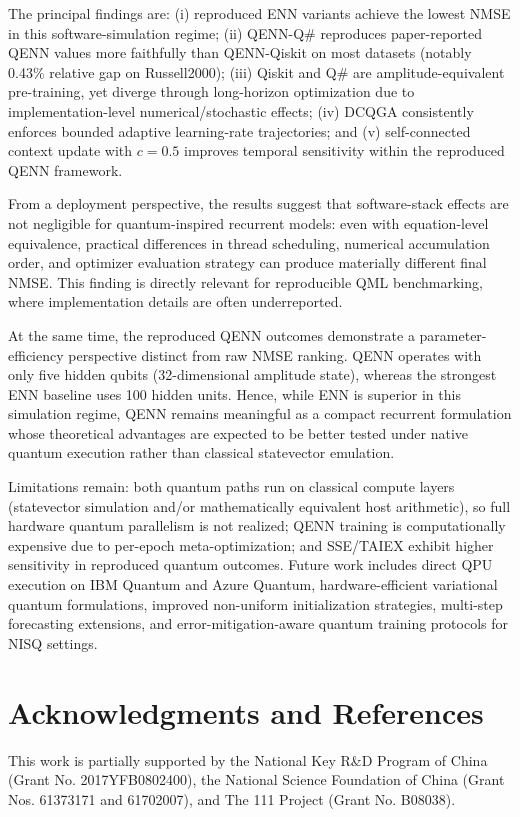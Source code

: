 \documentclass[conference]{IEEEtran}
\begin{document}
The principal findings are: (i) reproduced ENN variants achieve the lowest NMSE in this software-simulation regime; (ii) QENN-Q\# reproduces paper-reported QENN values more faithfully than QENN-Qiskit on most datasets (notably 0.43\% relative gap on Russell2000); (iii) Qiskit and Q\# are amplitude-equivalent pre-training, yet diverge through long-horizon optimization due to implementation-level numerical/stochastic effects; (iv) DCQGA consistently enforces bounded adaptive learning-rate trajectories; and (v) self-connected context update with $c=0.5$ improves temporal sensitivity within the reproduced QENN framework.

From a deployment perspective, the results suggest that software-stack effects are not negligible for quantum-inspired recurrent models: even with equation-level equivalence, practical differences in thread scheduling, numerical accumulation order, and optimizer evaluation strategy can produce materially different final NMSE. This finding is directly relevant for reproducible QML benchmarking, where implementation details are often underreported.

At the same time, the reproduced QENN outcomes demonstrate a parameter-efficiency perspective distinct from raw NMSE ranking. QENN operates with only five hidden qubits (32-dimensional amplitude state), whereas the strongest ENN baseline uses 100 hidden units. Hence, while ENN is superior in this simulation regime, QENN remains meaningful as a compact recurrent formulation whose theoretical advantages are expected to be better tested under native quantum execution rather than classical statevector emulation.

Limitations remain: both quantum paths run on classical compute layers (statevector simulation and/or mathematically equivalent host arithmetic), so full hardware quantum parallelism is not realized; QENN training is computationally expensive due to per-epoch meta-optimization; and SSE/TAIEX exhibit higher sensitivity in reproduced quantum outcomes. Future work includes direct QPU execution on IBM Quantum and Azure Quantum, hardware-efficient variational quantum formulations, improved non-uniform initialization strategies, multi-step forecasting extensions, and error-mitigation-aware quantum training protocols for NISQ settings.

\section{Acknowledgments and References}
This work is partially supported by the National Key R\&D Program of China (Grant No. 2017YFB0802400), the National Science Foundation of China (Grant Nos. 61373171 and 61702007), and The 111 Project (Grant No. B08038).
\end{document}
